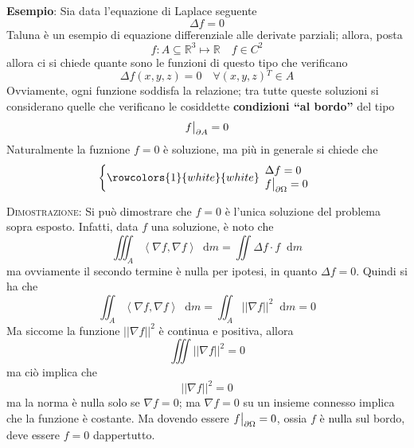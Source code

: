 \documentclass[a4paper]{extarticle}
\newcommand{\quotes}[1]{``#1''}
\newcommand*\dif{\mathop{}\!\mathrm{d}}
\newcommand\restr[2]{{%
  \left.\kern-\nulldelimiterspace %
  #1 %
  \vphantom{\big|} %
  \right|_{#2} %
  }}
\begin{document}
\vspace{2em}
\noindent
\textbf{Esempio}: Sia data l'equazione di Laplace seguente
\[\Delta f = 0\]
Taluna è un esempio di equazione differenziale alle derivate parziali; allora, posta
\[f : A \subseteq \mathbb{R}^3 \longmapsto \mathbb{R} \hspace{1em} f \in C^2\]
allora ci si chiede quante sono le funzioni di questo tipo che verificano
\[\Delta f (x,y,z) = 0\hspace{1em} \forall (x,y,z){^T} \in A\]
Ovviamente, ogni funzione soddisfa la relazione; tra tutte queste soluzioni si considerano quelle che verificano le cosiddette \textbf{condizioni \quotes{al bordo}} del tipo
\[\restr{f}{\partial A} = 0\]
Naturalmente la fuznione $f=0$ è soluzione, ma più in generale si chiede che
\[
    \left\{
        \rowcolors{1}{white}{white}
        \begin{array}{l}
            \Delta f =0\\
            \restr{f}{\partial \Omega}=0\\
        \end{array}
    \right.
\]

\vspace{2em}
\noindent
\normalfont \normalsize
\textsc{Dimostrazione}: Si può dimostrare che $f=0$ è l'unica soluzione del problema sopra esposto. Infatti, data $f$ una soluzione, è noto che
\[\iiint_A \left<\nabla f,\nabla f\right> \dif m = \iint \Delta f \cdot f \dif m\]
ma ovviamente il secondo termine è nulla per ipotesi, in quanto $\Delta f =0$. Quindi si ha che
\[\iint_A \left<\nabla f, \nabla f\right> \dif m = \iint_A \vert\vert \nabla f \vert\vert^2 \dif m = 0\]
Ma siccome la funzione $\vert\vert \nabla f \vert\vert^2$ è continua e positiva, allora
\[\iiint \vert\vert \nabla f \vert\vert^2 = 0\]
ma ciò implica che
\[\vert\vert \nabla f \vert\vert^2=0\]
ma la norma è nulla solo se $\nabla f =0$; ma $\nabla f = 0$ su un insieme connesso implica che la funzione è costante. Ma dovendo essere $\restr{f}{\partial \Omega}=0$, ossia $f$ è nulla sul bordo, deve essere $f=0$ dappertutto.
\end{document}
